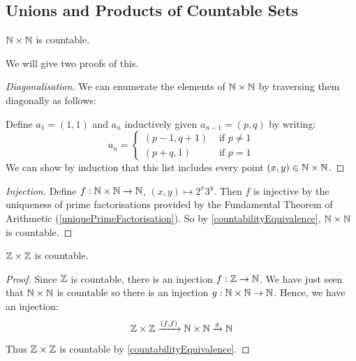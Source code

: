 \documentclass[../main.tex]{subfiles}
\begin{document}
\subsection{Unions and Products of Countable Sets}
\begin{theorem}
  $\mathbb{N} \times \mathbb{N}$ is countable. \label{NxNCountable}
\end{theorem}
We will give two proofs of this.
\begin{proof}[Diagonalisation]
  We can enumerate the elements of $\mathbb{N} \times \mathbb{N}$ by traversing them diagonally as follows:
  \begin{center}
  \end{center}
  Define $a_1 = (1, 1)$ and $a_n$ inductively given $a_{n-1} = (p, q)$ by writing:
  \[
    a_n = \begin{cases}
    (p - 1, q + 1) & \text{ if } p \neq 1 \\
    (p + q, 1) & \text{ if } p = 1
    \end{cases}
  \]
  We can show by induction that this list includes every point $(x, y) \in \mathbb{N} \times \mathbb{N}$.
\end{proof}
\label{ftaInjectiveProof}
\begin{proof}[Injection]
  Define $f: \mathbb{N} \times \mathbb{N} \to \mathbb{N}$, $(x, y) \mapsto 2^{x}3^{y}$.
  Then $f$ is injective by the uniqueness of prime factorisations provided by the Fundamental Theorem of Arithmetic (\cref{uniquePrimeFactorisation}).
  So by \cref{countabilityEquivalence}, $\mathbb{N} \times \mathbb{N}$ is countable.
\end{proof}
\begin{corollary}
  $\mathbb{Z} \times \mathbb{Z}$ is countable.
\end{corollary}
\begin{proof}
  Since $\mathbb{Z}$ is countable, there is an injection $f: \mathbb{Z} \to \mathbb{N}$.
  We have just seen that $\mathbb{N} \times \mathbb{N}$ is countable so there is an injection $g: \mathbb{N} \times \mathbb{N} \to \mathbb{N}$.
  Hence, we have an injection:
  \[
    \mathbb{Z} \times \mathbb{Z} \xrightarrow{(f, f)} \mathbb{N} \times \mathbb{N} \xrightarrow{g} \mathbb{N}
  \]
  Thus $\mathbb{Z} \times \mathbb{Z}$ is countable by \cref{countabilityEquivalence}.
\end{proof}
\end{document}
